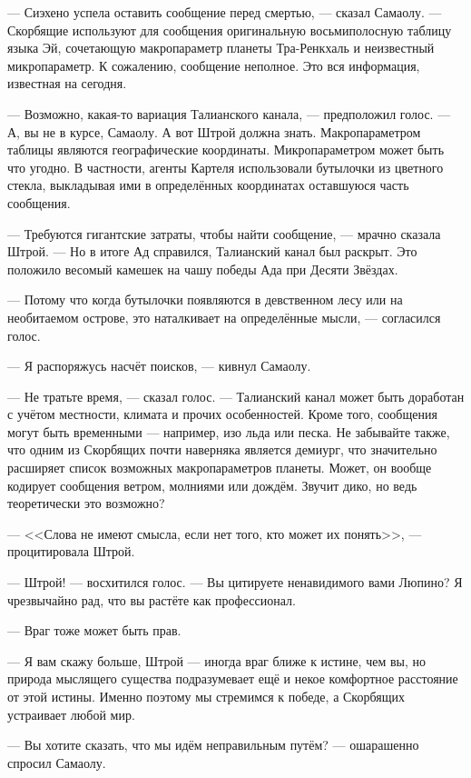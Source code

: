 \textspace

--- Сиэхено успела оставить сообщение перед смертью, --- сказал Самаолу.
--- Скорбящие используют для сообщения оригинальную восьмиполосную таблицу языка Эй, сочетающую макропараметр планеты Тра-Ренкхаль и неизвестный микропараметр.
К сожалению, сообщение неполное.
Это вся информация, известная на сегодня.

--- Возможно, какая-то вариация Талианского канала, --- предположил голос.
--- А, вы не в курсе, Самаолу.
А вот Штрой должна знать.
Макропараметром таблицы являются географические координаты.
Микропараметром может быть что угодно.
В частности, агенты Картеля использовали бутылочки из цветного стекла, выкладывая ими в определённых координатах оставшуюся часть сообщения.

--- Требуются гигантские затраты, чтобы найти сообщение, --- мрачно сказала Штрой.
--- Но в итоге Ад справился, Талианский канал был раскрыт.
Это положило весомый камешек на чашу победы Ада при Десяти Звёздах.

--- Потому что когда бутылочки появляются в девственном лесу или на необитаемом острове, это наталкивает на определённые мысли, --- согласился голос.

--- Я распоряжусь насчёт поисков, --- кивнул Самаолу.

--- Не тратьте время, --- сказал голос.
--- Талианский канал может быть доработан с учётом местности, климата и прочих особенностей.
Кроме того, сообщения могут быть временными --- например, изо льда или песка.
Не забывайте также, что одним из Скорбящих почти наверняка является демиург, что значительно расширяет список возможных макропараметров планеты.
Может, он вообще кодирует сообщения ветром, молниями или дождём.
Звучит дико, но ведь теоретически это возможно?

--- <<Слова не имеют смысла, если нет того, кто может их понять>>, --- процитировала Штрой.

--- Штрой! --- восхитился голос.
--- Вы цитируете ненавидимого вами Люпино?
Я чрезвычайно рад, что вы растёте как профессионал.

--- Враг тоже может быть прав.

--- Я вам скажу больше, Штрой --- иногда враг ближе к истине, чем вы, но природа мыслящего существа подразумевает ещё и некое комфортное расстояние от этой истины.
Именно поэтому мы стремимся к победе, а Скорбящих устраивает любой мир.

--- Вы хотите сказать, что мы идём неправильным путём? --- ошарашенно спросил Самаолу.

